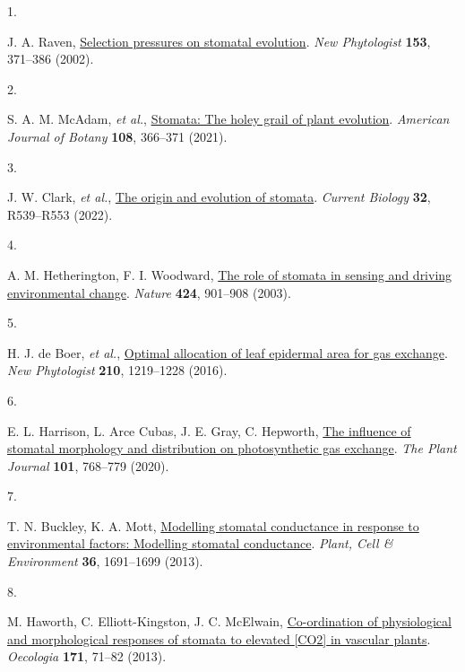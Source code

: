 \documentclass[
  letterpaper,
  DIV=11,
  numbers=noendperiod]{scrartcl}
\newlength{\cslhangindent}
\newlength{\csllabelwidth}
\newenvironment{CSLReferences}[2] %
 {\begin{list}{}{%
  \setlength{\itemindent}{0pt}
  \setlength{\leftmargin}{0pt}
  \setlength{\parsep}{0pt}
  \ifodd #1
   \setlength{\leftmargin}{\cslhangindent}
   \setlength{\itemindent}{-1\cslhangindent}
  \fi
  \setlength{\itemsep}{#2\baselineskip}}}
 {\end{list}}
\newcommand{\CSLLeftMargin}[1]{\parbox[t]{\csllabelwidth}{\strut#1\strut}}
\newcommand{\CSLRightInline}[1]{\parbox[t]{\linewidth - \csllabelwidth}{\strut#1\strut}}
\begin{document}
\label{refs}
\begin{CSLReferences}{0}{1}
\CSLLeftMargin{1. }%
\CSLRightInline{J. A. Raven,
\href{https://doi.org/10.1046/j.0028-646X.2001.00334.x}{Selection
pressures on stomatal evolution}. \emph{New Phytologist} \textbf{153},
371--386 (2002).}

\CSLLeftMargin{2. }%
\CSLRightInline{S. A. M. McAdam, \emph{et al.},
\href{https://doi.org/10.1002/ajb2.1619}{Stomata: The holey grail of
plant evolution}. \emph{American Journal of Botany} \textbf{108},
366--371 (2021).}

\CSLLeftMargin{3. }%
\CSLRightInline{J. W. Clark, \emph{et al.},
\href{https://doi.org/10.1016/j.cub.2022.04.040}{The origin and
evolution of stomata}. \emph{Current Biology} \textbf{32}, R539--R553
(2022).}

\CSLLeftMargin{4. }%
\CSLRightInline{A. M. Hetherington, F. I. Woodward,
\href{https://doi.org/10.1038/nature01843}{The role of stomata in
sensing and driving environmental change}. \emph{Nature} \textbf{424},
901--908 (2003).}

\CSLLeftMargin{5. }%
\CSLRightInline{H. J. de Boer, \emph{et al.},
\href{https://doi.org/10.1111/nph.13929}{Optimal allocation of leaf
epidermal area for gas exchange}. \emph{New Phytologist} \textbf{210},
1219--1228 (2016).}

\CSLLeftMargin{6. }%
\CSLRightInline{E. L. Harrison, L. Arce Cubas, J. E. Gray, C. Hepworth,
\href{https://doi.org/10.1111/tpj.14560}{The influence of stomatal
morphology and distribution on photosynthetic gas exchange}. \emph{The
Plant Journal} \textbf{101}, 768--779 (2020).}

\CSLLeftMargin{7. }%
\CSLRightInline{T. N. Buckley, K. A. Mott,
\href{https://doi.org/10.1111/pce.12140}{Modelling stomatal conductance
in response to environmental factors: {Modelling} stomatal conductance}.
\emph{Plant, Cell \& Environment} \textbf{36}, 1691--1699 (2013).}

\CSLLeftMargin{8. }%
\CSLRightInline{M. Haworth, C. Elliott-Kingston, J. C. McElwain,
\href{https://doi.org/10.1007/s00442-012-2406-9}{Co-ordination of
physiological and morphological responses of stomata to elevated
{[}{CO2}{]} in vascular plants}. \emph{Oecologia} \textbf{171}, 71--82
(2013).}


\end{CSLReferences}
\end{document}
